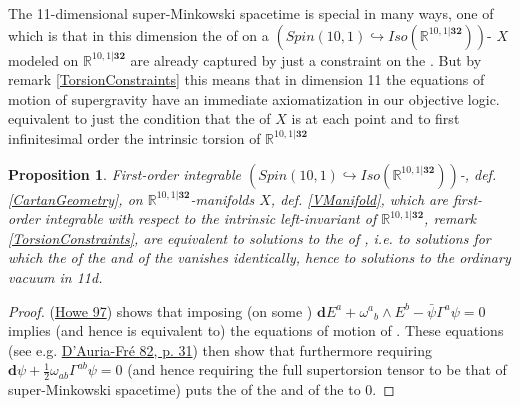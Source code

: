 \documentclass[12pt,titlepage]{article}
\theoremstyle{plain}
\newtheorem{prop}{Proposition}
\theoremstyle{definition}
\theoremstyle{remark}
\begin{document}
The 11-dimensional super-Minkowski spacetime is special in many ways, one of which is that in this dimension the  of  on a $(Spin(10,1)\hookrightarrow Iso(\mathbb{R}^{10,1\vert \mathbf{32}}))$- $X$ modeled on $\mathbb{R}^{10,1\vert \mathbf{32}}$ are already captured by just a constraint on the . But by remark \ref{TorsionConstraints} this means that in dimension 11 the equations of motion of supergravity have an immediate axiomatization in our objective logic.
equivalent to just the condition that the of $X$ is at each point and to first infinitesimal order the intrinsic torsion of $\mathbb{R}^{10,1\vert \mathbf{32}}$
\begin{prop}
\label{VacuumSolutionsIn11d}\hypertarget{VacuumSolutionsIn11d}{}
First-order integrable $(Spin(10,1)\hookrightarrow Iso(\mathbb{R}^{10,1\vert \mathbf{32}}))$-, def. \ref{CartanGeometry}, on $\mathbb{R}^{10,1\vert\mathbf{32}}$-manifolds $X$, def. \ref{VManifold}, which are first-order integrable with respect to the intrinsic left-invariant  of $\mathbb{R}^{10,1\vert \mathbf{32}}$, remark \ref{TorsionConstraints}, are equivalent to  solutions to the  of , i.e. to solutions for which the  of the  and of the  vanishes identically, hence to solutions to the ordinary vacuum  in 11d.
\end{prop}
\begin{proof}
(\href{http://ncatlab.org/nlab/show/torsion+constraints+in+supergravity#Howe97}{Howe 97}) shows that imposing (on some ) $\mathbf{d} E^a + \omega^{a}{}_b \wedge E^b - \bar \psi \Gamma^a \psi  = 0$ implies (and hence is equivalent to) the equations of motion of . These equations (see e.g. \href{http://ncatlab.org/nlab/show/11-dimensional%20supergravity#DAuriaFre}{D'Auria-Fré 82, p. 31}) then show that furthermore requiring $\mathbf{d} \psi + \tfrac{1}{2}\omega_{a b} \Gamma^{a b}\psi = 0$ (and hence requiring the full supertorsion tensor to be that of super-Minkowski spacetime) puts the \LabRef{nLab}{field strength} of the \LabRef{nLab}{gravitino} and of the \LabRef{nLab}{supergravity C-field} to 0.
\end{proof}
\end{document}
